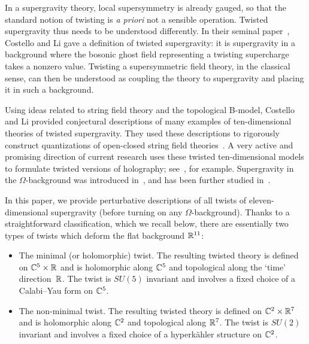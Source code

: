 In a supergravity theory, local supersymmetry is already gauged, so that the standard notion of twisting is {\em a priori} not a sensible operation. Twisted supergravity thus needs to be  understood differently.
In their seminal paper~\cite{CLsugra}, Costello and Li gave a definition of twisted supergravity: it is supergravity in a background where the bosonic ghost field representing a twisting supercharge takes a nonzero value.
Twisting a supersymmetric field theory, in the classical sense, can then be  understood as coupling the theory to supergravity and placing it in such a background.

Using ideas related to string field theory and the topological B-model, Costello and Li provided conjectural descriptions of many examples of ten-dimensional theories of twisted supergravity. They used these descriptions to rigorously construct quantizations of open-closed string field theories~\cite{CLbcov1,CLtypeI}. 
A very active and promising direction of current research uses these twisted ten-dimensional models to formulate twisted versions of holography; see~\cite{CostelloM2, Costello_2021, costello2021twisted, Ishtiaque_2020, budzik2021giant, Gaiotto:2020vqj}, for example.
Supergravity in the $\Omega$-background was introduced in~\cite{CostelloM5}, and has been further studied in~\cite{Gaiotto:2019wcc, Oh:2020hph, Oh:2021bwi}. 

In this paper, we provide perturbative descriptions of all twists of eleven-dimensional supergravity (before turning on any $\Omega$-background).
Thanks to a straightforward classification, which we recall below, there are essentially two types of twists which deform the flat background $\mathbb R^{11}$: 
\begin{itemize}[leftmargin=\parindent,itemsep=\parskip]
\item The minimal (or holomorphic) twist. 
The resulting twisted theory is defined on $\mathbb C^5 \times \mathbb R$ and is holomorphic along $\mathbb C^5$ and topological along the `time' direction~$\mathbb R$. 
The twist is $SU(5)$ invariant and involves a fixed choice of a Calabi--Yau form on $\mathbb C^5$. 
\item The non-minimal twist. 
The resulting twisted theory is defined on $\mathbb C^2 \times \mathbb R^7$ and is holomorphic along $\mathbb C^2$ and topological along $\mathbb R^7$.
The twist is $SU(2)$ invariant and involves a fixed choice of a hyperk\"ahler structure on $\mathbb C^2$.  
\end{itemize}

